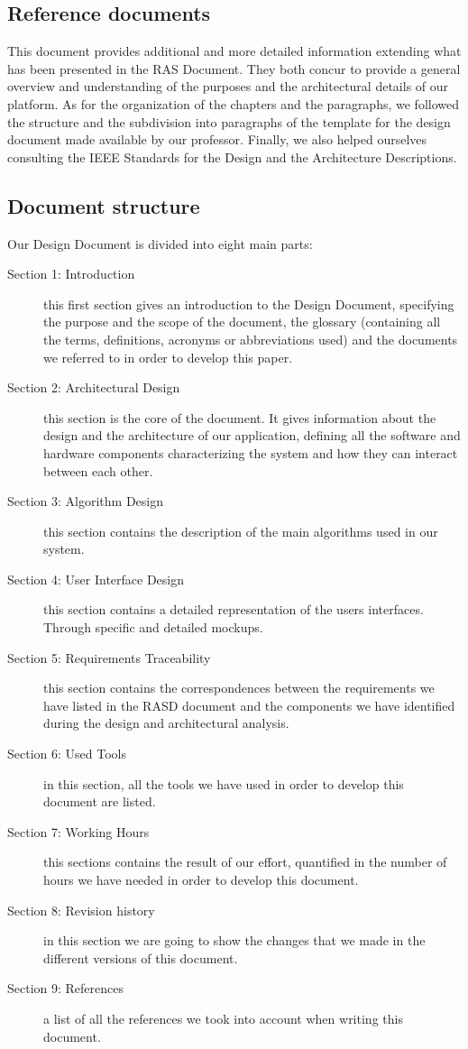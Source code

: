  
\subsection{Reference documents }
This document provides additional and more detailed information extending what has been
presented in the RAS Document. They both concur to provide a general overview and understanding
of the purposes and the architectural details of our platform.
As for the organization of the chapters and the paragraphs, we followed the structure and the 
subdivision into paragraphs of the template for the design document made available by our professor. 
Finally, we also helped ourselves consulting the IEEE Standards for the Design and the Architecture 
Descriptions. 
 
 
\subsection{Document structure}
Our Design Document is divided into eight main parts: 
\begin{description}
    \item[Section 1: Introduction]
        this first section gives an introduction to the Design Document, specifying the purpose and the 
        scope of the document, the glossary (containing all the terms, definitions, acronyms or 
        abbreviations used) and the documents we referred to in order to develop this paper. 
    \item[Section 2: Architectural Design]
        this section is the core of the document. It gives information about the design and the 
        architecture of our application, defining all the software and hardware components 
        characterizing the system and how they can interact between each other.
    \item[Section 3: Algorithm Design]
        this section contains the description of the main algorithms used in our system. 
    \item[Section 4: User Interface Design]
        this section contains a detailed representation of the users interfaces. Through specific and 
        detailed mockups. 
    \item[Section 5: Requirements Traceability] 
        this section contains the correspondences between the requirements we have listed in the 
        RASD document and the components we have identified during the design and architectural 
        analysis. 
    \item[Section 6: Used Tools] 
        in this section, all the tools we have used in order to develop this document are listed. 
    \item[Section 7: Working Hours] 
        this sections contains the result of our effort, quantified in the number of hours we have 
        needed in order to develop this document. 
    \item[Section 8: Revision history] in this section we are going to show the changes that we made in the different versions of this document.
    \item[Section 9: References] 
        a list of all the references we took into account when writing this document.
\end{description}
